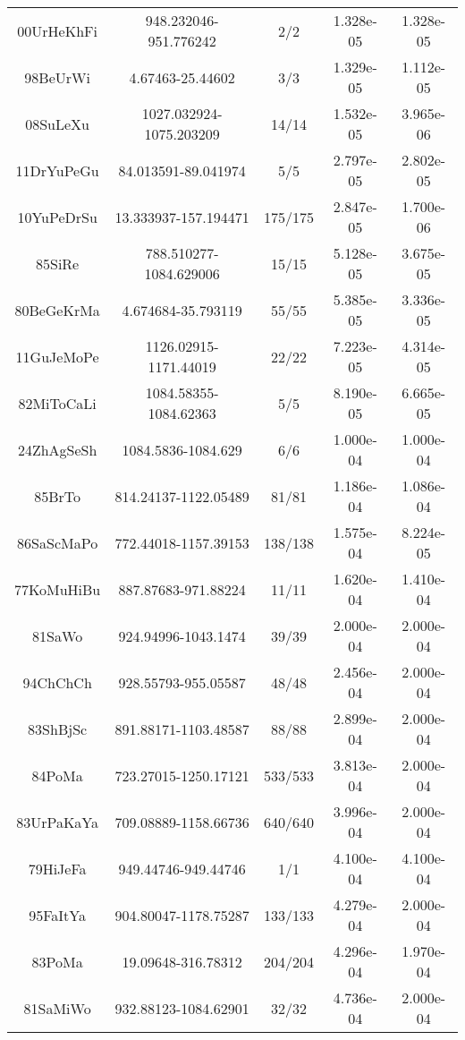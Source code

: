 \begin{longtable}{c c c c c}
00UrHeKhFi \cite{00UrHeKhFi} & 948.232046-951.776242 & 2/2 & 1.328e-05 & 1.328e-05 \\
98BeUrWi \cite{98BeUrWi} & 4.67463-25.44602 & 3/3 & 1.329e-05 & 1.112e-05 \\
08SuLeXu \cite{08SuLeXu} & 1027.032924-1075.203209 & 14/14 & 1.532e-05 & 3.965e-06 \\
11DrYuPeGu \cite{11DrYuPeGu} & 84.013591-89.041974 & 5/5 & 2.797e-05 & 2.802e-05 \\
10YuPeDrSu \cite{10YuPeDrSu} & 13.333937-157.194471 & 175/175 & 2.847e-05 & 1.700e-06 \\
85SiRe \cite{85SiRe} & 788.510277-1084.629006 & 15/15 & 5.128e-05 & 3.675e-05 \\
80BeGeKrMa \cite{80BeGeKrMa} & 4.674684-35.793119 & 55/55 & 5.385e-05 & 3.336e-05 \\
11GuJeMoPe \cite{11GuJeMoPe} & 1126.02915-1171.44019 & 22/22 & 7.223e-05 & 4.314e-05 \\
82MiToCaLi \cite{82MiToCaLi} & 1084.58355-1084.62363 & 5/5 & 8.190e-05 & 6.665e-05 \\
24ZhAgSeSh \cite{24ZhAgSeSh} & 1084.5836-1084.629 & 6/6 & 1.000e-04 & 1.000e-04 \\
85BrTo \cite{85BrTo} & 814.24137-1122.05489 & 81/81 & 1.186e-04 & 1.086e-04 \\
86SaScMaPo \cite{86SaScMaPo} & 772.44018-1157.39153 & 138/138 & 1.575e-04 & 8.224e-05 \\
77KoMuHiBu \cite{77KoMuHiBu} & 887.87683-971.88224 & 11/11 & 1.620e-04 & 1.410e-04 \\
81SaWo \cite{81SaWo} & 924.94996-1043.1474 & 39/39 & 2.000e-04 & 2.000e-04 \\
94ChChCh \cite{94ChChCh} & 928.55793-955.05587 & 48/48 & 2.456e-04 & 2.000e-04 \\
83ShBjSc \cite{83ShBjSc} & 891.88171-1103.48587 & 88/88 & 2.899e-04 & 2.000e-04 \\
84PoMa \cite{84PoMa} & 723.27015-1250.17121 & 533/533 & 3.813e-04 & 2.000e-04 \\
83UrPaKaYa \cite{83UrPaKaYa} & 709.08889-1158.66736 & 640/640 & 3.996e-04 & 2.000e-04 \\
79HiJeFa \cite{79HiJeFa} & 949.44746-949.44746 & 1/1 & 4.100e-04 & 4.100e-04 \\
95FaItYa \cite{95FaItYa} & 904.80047-1178.75287 & 133/133 & 4.279e-04 & 2.000e-04 \\
83PoMa \cite{83PoMa} & 19.09648-316.78312 & 204/204 & 4.296e-04 & 1.970e-04 \\
81SaMiWo \cite{81SaMiWo} & 932.88123-1084.62901 & 32/32 & 4.736e-04 & 2.000e-04 \\

\end{longtable}
